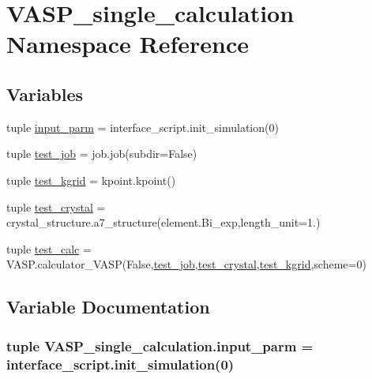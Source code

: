 \hypertarget{namespace_v_a_s_p__single__calculation}{\section{V\+A\+S\+P\+\_\+single\+\_\+calculation Namespace Reference}
\label{namespace_v_a_s_p__single__calculation}
}
\subsection*{Variables}
\begin{DoxyCompactItemize}
\item 
tuple \hyperlink{namespace_v_a_s_p__single__calculation_a04d14eb14efc4702b047e7876599a2a5}{input\+\_\+parm} = interface\+\_\+script.\+init\+\_\+simulation(0)
\item 
tuple \hyperlink{namespace_v_a_s_p__single__calculation_a67b805df27d2854ee30e7d04cc24af1f}{test\+\_\+job} = job.\+job(subdir=False)
\item 
tuple \hyperlink{namespace_v_a_s_p__single__calculation_aa433214ab7a7849ed7a12c9a6c93673d}{test\+\_\+kgrid} = kpoint.\+kpoint()
\item 
tuple \hyperlink{namespace_v_a_s_p__single__calculation_a95007ceef71632af1580958dce2ddf6a}{test\+\_\+crystal} = crystal\+\_\+structure.\+a7\+\_\+structure(element.\+Bi\+\_\+exp,length\+\_\+unit=1.)
\item 
tuple \hyperlink{namespace_v_a_s_p__single__calculation_a07575b1567d68cb3c8e78d509898c09c}{test\+\_\+calc} = V\+A\+S\+P.\+calculator\+\_\+\+V\+A\+S\+P(False,\hyperlink{namespace_v_a_s_p__single__calculation_a67b805df27d2854ee30e7d04cc24af1f}{test\+\_\+job},\hyperlink{namespace_v_a_s_p__single__calculation_a95007ceef71632af1580958dce2ddf6a}{test\+\_\+crystal},\hyperlink{namespace_v_a_s_p__single__calculation_aa433214ab7a7849ed7a12c9a6c93673d}{test\+\_\+kgrid},scheme=0)
\end{DoxyCompactItemize}


\subsection{Variable Documentation}
\hypertarget{namespace_v_a_s_p__single__calculation_a04d14eb14efc4702b047e7876599a2a5}{
\subsubsection[{input\+\_\+parm}]{\setlength{\rightskip}{0pt plus 5cm}tuple V\+A\+S\+P\+\_\+single\+\_\+calculation.\+input\+\_\+parm = interface\+\_\+script.\+init\+\_\+simulation(0)}}\label{namespace_v_a_s_p__single__calculation_a04d14eb14efc4702b047e7876599a2a5}


